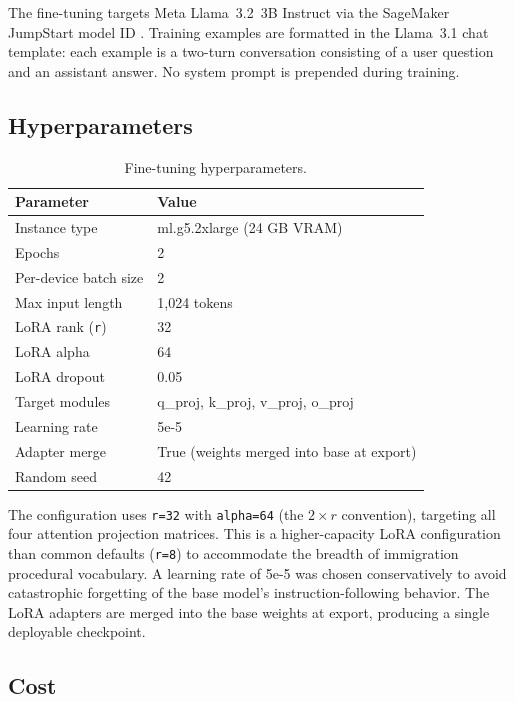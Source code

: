 \documentclass[11pt]{article}
\begin{document}
The fine-tuning targets Meta Llama~3.2~3B Instruct via the SageMaker JumpStart model ID . Training examples are formatted in the Llama~3.1 chat template: each example is a two-turn conversation consisting of a user question and an assistant answer. No system prompt is prepended during training.

\subsection{Hyperparameters}

\begin{table}[ht]
  \centering
  \caption{Fine-tuning hyperparameters.}
  \label{tab:hparams}
  \begin{tabular}{ll}
    \toprule
    Parameter & Value \\
    \midrule
    Instance type & ml.g5.2xlarge (24 GB VRAM) \\
    Epochs & 2 \\
    Per-device batch size & 2 \\
    Max input length & 1,024 tokens \\
    LoRA rank (\texttt{r}) & 32 \\
    LoRA alpha & 64 \\
    LoRA dropout & 0.05 \\
    Target modules & q\_proj, k\_proj, v\_proj, o\_proj \\
    Learning rate & 5e-5 \\
    Adapter merge & True (weights merged into base at export) \\
    Random seed & 42 \\
    \bottomrule
  \end{tabular}
\end{table}

The configuration uses \texttt{r=32} with \texttt{alpha=64} (the $2\times r$ convention), targeting all four attention projection matrices. This is a higher-capacity LoRA configuration than common defaults (\texttt{r=8}) to accommodate the breadth of immigration procedural vocabulary. A learning rate of 5e-5 was chosen conservatively to avoid catastrophic forgetting of the base model's instruction-following behavior. The LoRA adapters are merged into the base weights at export, producing a single deployable checkpoint.

\subsection{Cost}
\end{document}
